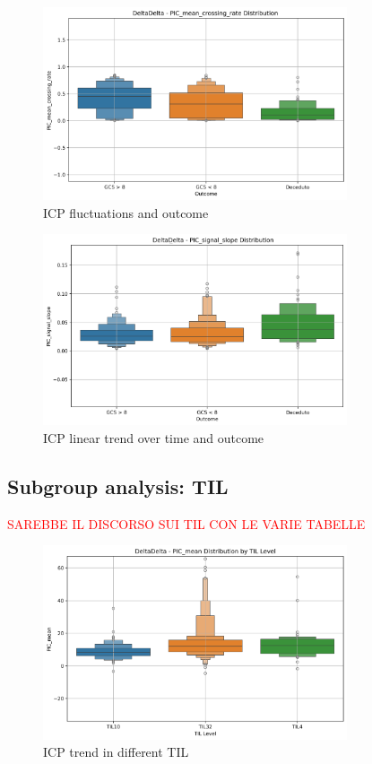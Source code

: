\begin{figure}[h!]
    \centering
    \includegraphics[width=0.8\textwidth]{pictures/fig10_ICPfluctuations.png}
    \caption{ICP fluctuations and outcome} %
    \label{fig:ICPfluctuations_outcome} %
\end{figure}

\begin{figure}[h!]
    \centering
    \includegraphics[width=0.8\textwidth]{pictures/fig11_ICPslope.png}
    \caption{ICP linear trend over time and outcome} %
    \label{fig:ICPslope_outcome} %
\end{figure}

\subsection{Subgroup analysis: TIL}
\textcolor{red}{SAREBBE IL DISCORSO SUI TIL CON LE VARIE TABELLE}

\begin{figure}[h!]
    \centering
    \includegraphics[width=0.8\textwidth]{pictures/fig12_ICPTIL.png}
    \caption{ICP trend in different TIL} %
    \label{fig:ICPTIL} %
\end{figure}

